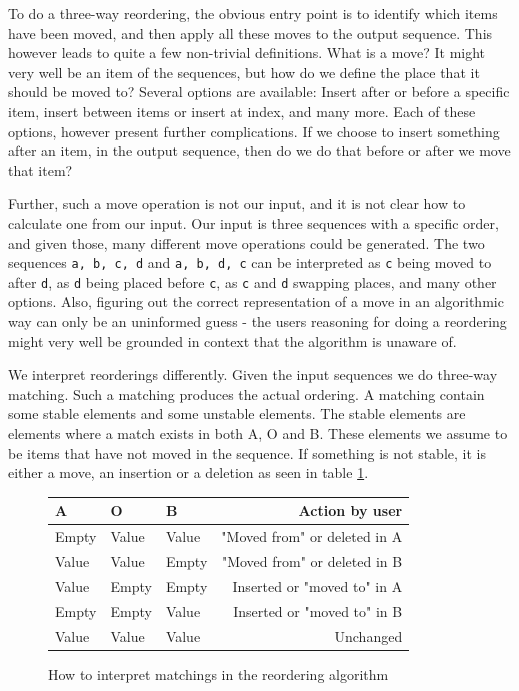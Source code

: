 \documentclass[11pt]{article}
\begin{document}
To do a three-way reordering, the obvious entry point is to identify which items have been moved, and then apply all these moves to the output sequence. This however leads to quite a few non-trivial definitions. What is a move? It might very well be an item of the sequences, but how do we define the place that it should be moved to? Several options are available: Insert after or before a specific item, insert between items or insert at index, and many more. Each of these options, however present further complications. If we choose to insert something after an item, in the output sequence, then do we do that before or after we move that item?

Further, such a move operation is not our input, and it is not clear how to calculate one from our input. Our input is three sequences with a specific order, and given those, many different move operations could be generated. The two sequences \texttt{a, b, c, d} and \texttt{a, b, d, c} can be interpreted as \texttt{c} being moved to after \texttt{d}, as \texttt{d} being placed before \texttt{c}, as \texttt{c} and \texttt{d} swapping places, and many other options. Also, figuring out the correct representation of a move in an algorithmic way can only be an uninformed guess - the users reasoning for doing a reordering might very well be grounded in context that the algorithm is unaware of.

We interpret reorderings differently. Given the input sequences we do three-way matching. Such a matching produces the actual ordering. A matching contain some stable elements and some unstable elements. The stable elements are elements where a match exists in both A, O and B. These elements we assume to be items that have not moved in the sequence. If something is not stable, it is either a move, an insertion or a deletion as seen in table \ref{ReorderingTable}.

\begin{figure}
\centering
\begin{tabular}{ | l | l | l || r |}
  \hline                        
   \textbf{A} & \textbf{O} & \textbf{B} & \textbf{Action by user} \\
  \hline                        
  Empty & Value & Value & "Moved from" or deleted in A \\
  Value & Value & Empty & "Moved from" or deleted in B \\
  Value & Empty & Empty & Inserted or "moved to" in A \\
  Empty & Empty & Value & Inserted or "moved to" in B \\
  Value & Value & Value & Unchanged \\
  \hline  
\end{tabular}
  \caption{How to interpret matchings in the reordering algorithm}
\label{ReorderingTable}
\end{figure}
\end{document}
